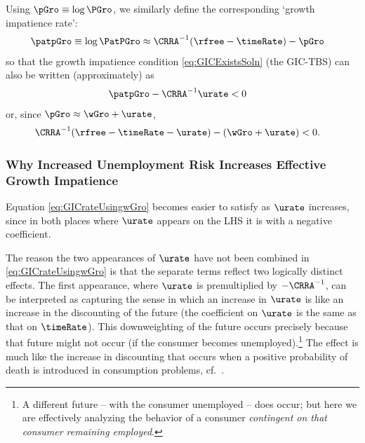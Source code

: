 \documentclass{handout}
\begin{document}
Using $\pGro \equiv \log \PGro$, we similarly define the corresponding `growth impatience rate':
\begin{equation}\begin{gathered}\begin{aligned}
  \patpGro & \equiv  \log \PatPGro \approx \CRRA^{-1}(\rfree-\timeRate) - \pGro
\end{aligned}\end{gathered}\end{equation}
so that the growth impatience condition \eqref{eq:GICExistsSoln} (the GIC-TBS) can also be written (approximately) as
\begin{equation}\begin{gathered}\begin{aligned}
  \patpGro - \CRRA^{-1}\urate & <  0   \label{eq:GICrateUsingpGro}
\end{aligned}\end{gathered}\end{equation}
or, since $\pGro \approx \wGro+\urate$, 
\begin{equation}\begin{gathered}\begin{aligned}
 \CRRA^{-1}(\rfree-\timeRate-\urate)-(\wGro+\urate) & <  0 \label{eq:GICrateUsingwGro}
.
\end{aligned}\end{gathered}\end{equation}

\subsubsection{Why Increased Unemployment Risk Increases Effective Growth Impatience}

Equation \eqref{eq:GICrateUsingwGro} becomes easier to satisfy as $\urate$ increases, since 
in both places where $\urate$ appears on the LHS it is with a negative coefficient.

The reason the two appearances of $\urate$ have not been combined in \eqref{eq:GICrateUsingwGro} is that the separate 
terms reflect two logically distinct effects.  The first appearance, where $\urate$ is premultiplied by $-\CRRA^{-1}$, 
can be interpreted as capturing the sense in which an increase in $\urate$ is like an increase in the discounting of the future (the
coefficient on $\urate$ is the same as that on $\timeRate$).  This downweighting of the future occurs precisely because that future
might not occur (if the consumer becomes unemployed).\footnote{A different future -- with the consumer unemployed -- does occur; but here we are effectively analyzing the behavior of a consumer {\it contingent on that consumer remaining employed}.}  The effect is much like the increase in discounting that occurs 
when a positive probability of death is introduced in consumption problems, cf.~\cite{blanchardFinite}.
\end{document}
